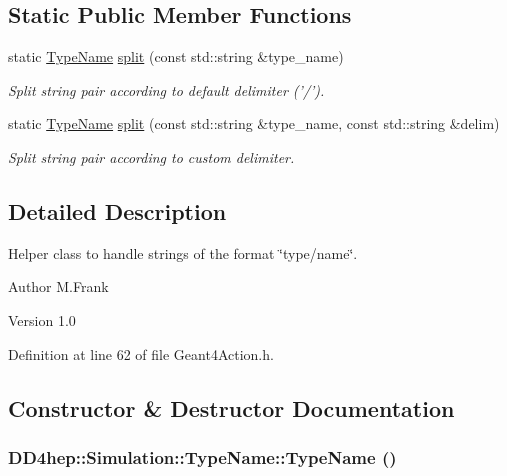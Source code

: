 \subsection*{Static Public Member Functions}
\begin{DoxyCompactItemize}
\item 
static \hyperlink{class_d_d4hep_1_1_simulation_1_1_type_name}{TypeName} \hyperlink{class_d_d4hep_1_1_simulation_1_1_type_name_a7deed2b938954f59c780e636ad5249da}{split} (const std::string \&type\_\-name)
\begin{DoxyCompactList}\small\item\em Split string pair according to default delimiter ('/'). \item\end{DoxyCompactList}\item 
static \hyperlink{class_d_d4hep_1_1_simulation_1_1_type_name}{TypeName} \hyperlink{class_d_d4hep_1_1_simulation_1_1_type_name_a63ab3d8b4c1f48ad15d6dd58643a2eaa}{split} (const std::string \&type\_\-name, const std::string \&delim)
\begin{DoxyCompactList}\small\item\em Split string pair according to custom delimiter. \item\end{DoxyCompactList}\end{DoxyCompactItemize}


\subsection{Detailed Description}
Helper class to handle strings of the format \char`\"{}type/name\char`\"{}. \begin{DoxyAuthor}{Author}
M.Frank 
\end{DoxyAuthor}
\begin{DoxyVersion}{Version}
1.0 
\end{DoxyVersion}


Definition at line 62 of file Geant4Action.h.

\subsection{Constructor \& Destructor Documentation}
\hypertarget{class_d_d4hep_1_1_simulation_1_1_type_name_acd01167ff15a1321cad0d90772911865}{
\subsubsection[{TypeName}]{\setlength{\rightskip}{0pt plus 5cm}DD4hep::Simulation::TypeName::TypeName ()}}
\label{class_d_d4hep_1_1_simulation_1_1_type_name_acd01167ff15a1321cad0d90772911865}


